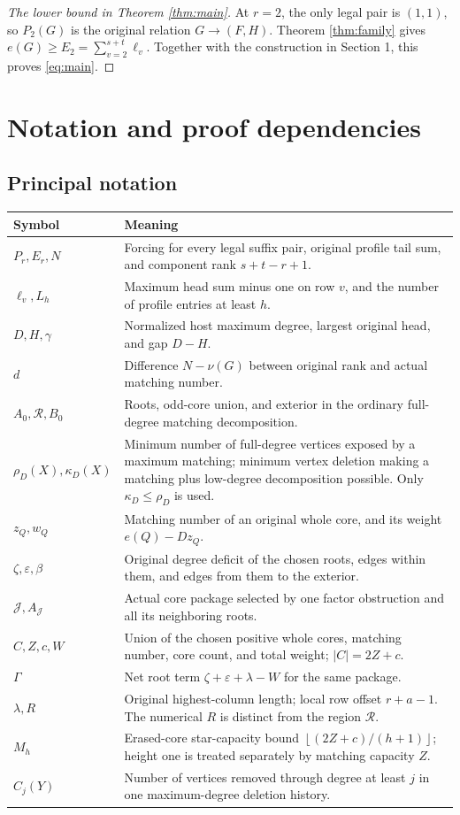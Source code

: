 \documentclass[11pt,a4paper]{article}
\newcommand{\floor}[1]{\left\lfloor#1\right\rfloor}
\theoremstyle{definition}
\begin{document}
\begin{proof}[The lower bound in Theorem \ref{thm:main}]
At $r=2$, the only legal pair is $(1,1)$, so $P_2(G)$ is the original relation $G\to(F,H)$. Theorem \ref{thm:family} gives $e(G)\ge E_2=\sum_{v=2}^{s+t}\ell_v$. Together with the construction in Section 1, this proves \eqref{eq:main}.
\end{proof}

\section{Notation and proof dependencies}\label{sec:dependencies}
\subsection{Principal notation}
\begin{longtable}{P{.22\textwidth}P{.7\textwidth}}
\toprule
Symbol & Meaning\\\midrule\endhead
$P_r,E_r,N$ & Forcing for every legal suffix pair, original profile tail sum, and component rank $s+t-r+1$.\\
$\ell_v,L_h$ & Maximum head sum minus one on row $v$, and the number of profile entries at least $h$.\\
$D,H,\gamma$ & Normalized host maximum degree, largest original head, and gap $D-H$.\\
$d$ & Difference $N-\nu(G)$ between original rank and actual matching number.\\
$A_0,\mathcal R,B_0$ & Roots, odd-core union, and exterior in the ordinary full-degree matching decomposition.\\
$\rho_D(X),\kappa_D(X)$ & Minimum number of full-degree vertices exposed by a maximum matching; minimum vertex deletion making a matching plus low-degree decomposition possible. Only $\kappa_D\le\rho_D$ is used.\\
$z_Q,w_Q$ & Matching number of an original whole core, and its weight $e(Q)-Dz_Q$.\\
$\zeta,\varepsilon,\beta$ & Original degree deficit of the chosen roots, edges within them, and edges from them to the exterior.\\
$\mathcal J,A_{\mathcal J}$ & Actual core package selected by one factor obstruction and all its neighboring roots.\\
$C,Z,c,W$ & Union of the chosen positive whole cores, matching number, core count, and total weight; $|C|=2Z+c$.\\
$\Gamma$ & Net root term $\zeta+\varepsilon+\lambda-W$ for the same package.\\
$\lambda,R$ & Original highest-column length; local row offset $r+a-1$. The numerical $R$ is distinct from the region $\mathcal R$.\\
$M_h$ & Erased-core star-capacity bound $\floor{(2Z+c)/(h+1)}$; height one is treated separately by matching capacity $Z$.\\
$C_j(Y)$ & Number of vertices removed through degree at least $j$ in one maximum-degree deletion history.\\
\bottomrule
\end{longtable}
\end{document}

